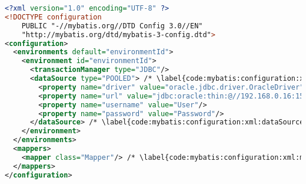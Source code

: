 
\begin{lstlisting}[language=XML, morekeywords={mapper,resultMap,result,select}, caption={MyBatis configuration}, label={code:mybatis:configuration:xml}]
<?xml version="1.0" encoding="UTF-8" ?>
<!DOCTYPE configuration
    PUBLIC "-//mybatis.org//DTD Config 3.0//EN"
    "http://mybatis.org/dtd/mybatis-3-config.dtd">
<configuration>
  <environments default="environmentId">
    <environment id="environmentId">
      <transactionManager type="JDBC"/>
      <dataSource type="POOLED"> /* \label{code:mybatis:configuration:xml:dataSource:begin} */
        <property name="driver" value="oracle.jdbc.driver.OracleDriver"/>
        <property name="url" value="jdbc:oracle:thin:@//192.168.0.16:1521/orcl"/>
        <property name="username" value="User"/>
        <property name="password" value="Password"/>
      </dataSource> /* \label{code:mybatis:configuration:xml:dataSource:end} */
    </environment>
  </environments>
  <mappers>
    <mapper class="Mapper"/> /* \label{code:mybatis:configuration:xml:mapper} */
  </mappers>
</configuration>
\end{lstlisting}
